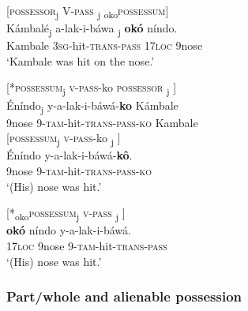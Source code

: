 \documentclass[output=paper]{langscibook}
\begin{document}
\ex \label{ex:schneider:ExternalPossessionPassivization}
\begin{xlist}

\ex \label{ex:schneider:PossessorPassivization}
[\textsc{possessor}\textsubscript{j} {  } \textsc{V-pass} {  } \underline{\hspace{0.5cm}}\textsubscript{j} {  } \textsubscript{oko}\textsc{possessum}] \\
\gll Kámbal\'e\textsubscript{j} a-lak-i-báwa  \underline{\hspace{0.5cm}}\textsubscript{j} \textbf{ok\'o} níndo.  \\
Kambale \textsc{3sg-}hit-\textsc{trans-pass} {   } \textsc{17loc} 9nose\\
\glt `Kambale was hit on the nose.' 

\ex \label{ex:schneider:NoOKOPossessumPassivization}
[*\textsc{possessum}\textsubscript{j} {  } \textsc{v-pass}-ko {  } \textsc{possessor} {  } \underline{\hspace{0.5cm}}\textsubscript{j} ] \\
\gll * \'Eníndo\textsubscript{j} y-a-lak-i-báwá-\textbf{ko} Kámbale\\
{} 9nose \textsc{9-tam-}hit-\textsc{trans-pass-ko} Kambale \\

\ex \label{ex:schneider:OKOPossessumPassivizationNoPossessor}
[\textsc{possessum}\textsubscript{j} {  } \textsc{v-pass}-ko {  } \underline{\hspace{0.5cm}}\textsubscript{j} ]\\
\gll \'Eníndo y-a-lak-i-báwá-\textbf{k\^o}. \\
9nose \textsc{9-tam-}hit-\textsc{trans-pass-ko} \\
\glt `(His) nose was hit.' 

\ex \label{ex:schneider:NoOKOPossessumPassivizationWithPossessor}
[{*}\textsubscript{oko}\textsc{possessum}\textsubscript{j} {  } \textsc{v-pass} {  } \underline{\hspace{0.5cm}}\textsubscript{j} ] \\
\gll {*}\textbf{ok\'o} níndo y-a-lak-i-báwá. \\
\textsc{17loc} 9nose \textsc{9-tam-}hit-\textsc{trans-pass} \\
\glt `(His) nose was hit.'  

\end{xlist}

\z

\subsubsection{Part/whole and alienable possession}\label{sec:schneider:subsection4.3.2}
\end{document}
